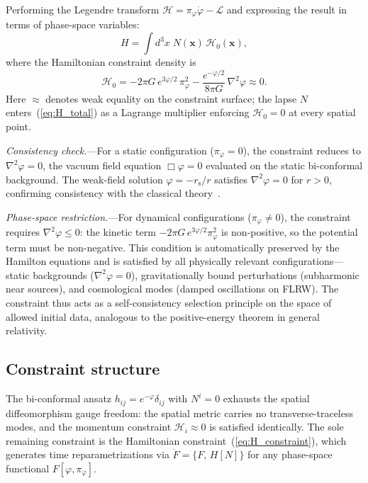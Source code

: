\documentclass[aps,prd,onecolumn,superscriptaddress,nofootinbib,showpacs,12pt,notitlepage]{revtex4-2}
\newcommand{\rs}{r_{\mathrm{s}}}
\begin{document}
Performing the Legendre transform
$\mathcal{H} = \pi_\varphi\dot{\varphi} - \mathcal{L}$
and expressing the result in terms of phase-space variables:
\begin{equation}\label{eq:H_total}
  H = \int d^3x\;N(\mathbf{x})\,\mathcal{H}_0(\mathbf{x}),
\end{equation}
where the Hamiltonian constraint density is
\begin{equation}\label{eq:H_constraint}
  \mathcal{H}_0
  = -2\pi G\,e^{3\varphi/2}\,\pi_\varphi^2
    - \frac{e^{-\varphi/2}}{8\pi G}\,\nabla^2\varphi
  \approx 0.
\end{equation}
Here $\approx$ denotes weak equality on the constraint surface;
the lapse $N$ enters~(\ref{eq:H_total}) as a Lagrange multiplier
enforcing $\mathcal{H}_0 = 0$ at every spatial point.

\textit{Consistency check.}---For a static configuration
($\pi_\varphi = 0$), the constraint reduces to
$\nabla^2\varphi = 0$, the vacuum field equation
$\Box\varphi = 0$ evaluated on the static bi-conformal
background.  The weak-field solution
$\varphi = -\rs/r$ satisfies $\nabla^2\varphi = 0$
for $r > 0$, confirming consistency with the classical
theory~\cite{Lotishvili2026}.

\textit{Phase-space restriction.}---For dynamical
configurations ($\pi_\varphi \neq 0$), the constraint
requires $\nabla^2\varphi \leq 0$: the kinetic term
$-2\pi G\,e^{3\varphi/2}\pi_\varphi^2$ is non-positive,
so the potential term must be non-negative.  This
condition is automatically preserved by the Hamilton
equations and is satisfied by all physically relevant
configurations---static backgrounds
($\nabla^2\varphi = 0$), gravitationally bound
perturbations (subharmonic near sources), and
cosmological modes (damped oscillations on FLRW).
The constraint thus acts as a self-consistency
selection principle on the space of allowed initial
data, analogous to the positive-energy theorem in
general relativity.

\subsection{Constraint structure}
\label{sec:constraint_structure}

The bi-conformal ansatz $h_{ij} = e^{-\varphi}\delta_{ij}$
with $N^i = 0$ exhausts the spatial diffeomorphism gauge
freedom: the spatial metric carries no transverse-traceless
modes, and the momentum constraint $\mathcal{H}_i \approx 0$
is satisfied identically.  The sole remaining constraint is
the Hamiltonian constraint~(\ref{eq:H_constraint}), which
generates time reparametrizations via
$\dot{F} = \{F,\,H[N]\}$ for any phase-space functional
$F[\varphi, \pi_\varphi]$.
\end{document}
